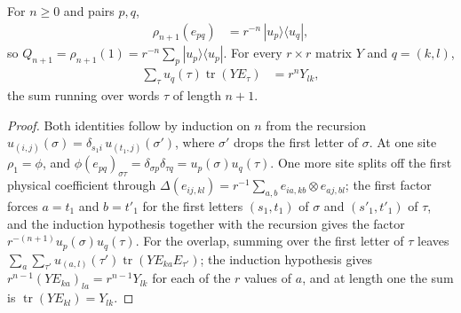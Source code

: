 \begin{lemma}
    \label{thm:glm_wha_bell_pair_represented}
    \leanok
    For $n\geq0$ and pairs $p,q$,
    \begin{align*}
        \rho_{n+1}(e_{pq}) & =r^{-n}\,|u_p\rangle\langle u_q|,
    \end{align*}
    so $Q_{n+1}=\rho_{n+1}(1)=r^{-n}\sum_p|u_p\rangle\langle u_p|$. For every
    $r\times r$ matrix $Y$ and $q=(k,l)$,
    \begin{align*}
        \sum_\tau u_q(\tau)\operatorname{tr}(YE_\tau) & =r^nY_{lk},
    \end{align*}
    the sum running over words $\tau$ of length $n+1$.
\end{lemma}
\begin{proof}
    \leanok
    Both identities follow by induction on $n$ from the recursion
    $u_{(i,j)}(\sigma)=\delta_{s_1i}\,u_{(t_1,j)}(\sigma')$, where $\sigma'$
    drops the first letter of $\sigma$. At one site $\rho_1=\phi$, and
    $\phi(e_{pq})_{\sigma\tau}=\delta_{\sigma p}\delta_{\tau q}=
        u_p(\sigma)u_q(\tau)$. One more site splits off the first physical
    coefficient through $\Delta(e_{ij,kl})=r^{-1}\sum_{a,b}e_{ia,kb}\otimes
        e_{aj,bl}$; the first factor forces $a=t_1$ and $b=t'_1$ for the first
    letters $(s_1,t_1)$ of $\sigma$ and $(s'_1,t'_1)$ of $\tau$, and the
    induction hypothesis together with the recursion gives the factor
    $r^{-(n+1)}u_p(\sigma)u_q(\tau)$. For the overlap, summing over the first
    letter of $\tau$ leaves
    $\sum_a\sum_{\tau'}u_{(a,l)}(\tau')\operatorname{tr}(YE_{ka}E_{\tau'})$;
    the induction hypothesis gives $r^{n-1}(YE_{ka})_{la}=r^{n-1}Y_{lk}$ for
    each of the $r$ values of $a$, and at length one the sum is
    $\operatorname{tr}(YE_{kl})=Y_{lk}$.
\end{proof}

